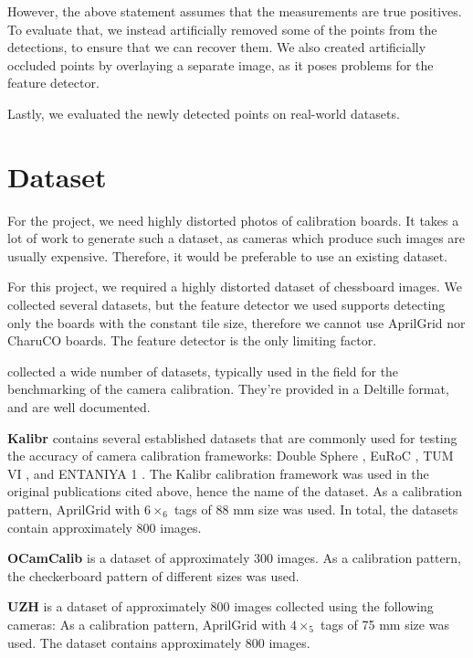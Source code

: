 However, the above statement assumes that the measurements are true positives.
To evaluate that, we instead artificially removed some of the points from the
detections, to ensure that we can recover them. We also created
artificially occluded points by overlaying a separate image, as it poses
problems for the feature detector.

Lastly, we evaluated the newly detected points on real-world datasets.

\section{Dataset}\label{sec:dataset}

For the project, we need highly distorted photos of calibration boards. It takes
a lot of work to generate such a dataset, as cameras which produce such images are
usually expensive. Therefore, it would be preferable to use an existing dataset.

For this project, we required a highly distorted dataset of chessboard images.
We collected several datasets, but the feature detector we used supports
detecting only the boards with the constant tile size, therefore we cannot use
AprilGrid nor CharuCO boards. The feature detector is the only limiting factor.

\textcite{lochmanBabelCalibUniversalApproach2021} collected a wide number of
datasets, typically used in the field for the benchmarking of the camera
calibration. They're provided in a Deltille \cite{DeltilleDetector2023} format,
and are well documented.

\textbf{Kalibr} \citep{mayeSelfsupervisedCalibrationRobotic2013} contains several established datasets that are commonly used for testing
the accuracy of camera calibration frameworks: Double Sphere
\cite{usenkoDoubleSphereCamera2018}, EuRoC \cite{burriEuRoCMicroAerial2016}, TUM
VI \cite{schubertTUMVIBenchmark2018}, and ENTANIYA 1
\cite{Calibration250degFisheye}.
The Kalibr calibration framework was used in the
original publications cited above, hence the name of the dataset.
As a calibration pattern, AprilGrid with  \(6\times_6\) tags of 88 mm size was used.
In total, the datasets contain approximately 800 images.

\textbf{OCamCalib} \citep{scaramuzzaFlexibleTechniqueAccurate2006} is a dataset
of approximately 300 images.
As a calibration pattern, the checkerboard pattern of different sizes was used.

\textbf{UZH} \citep{AreWeReady} is a dataset of approximately 800 images
collected using the following cameras:
As a calibration pattern, AprilGrid with \(4\times_5\) tags of 75 mm size was used.
The dataset contains approximately 800 images.

